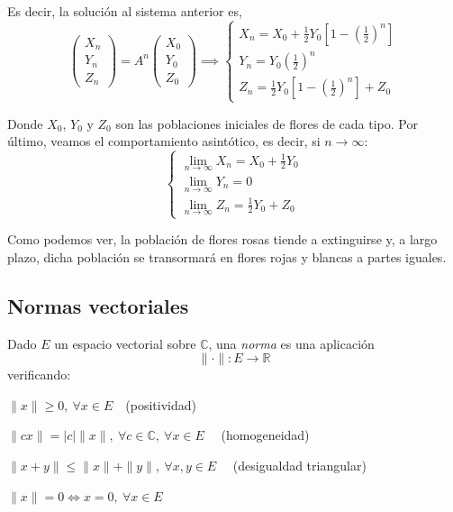 Es decir, la solución al sistema anterior es,
$$ \begin{pmatrix}
	X_n\\
	Y_n\\
	Z_n
\end{pmatrix} = A^n
\begin{pmatrix}
	X_0\\
	Y_0\\
	Z_0
\end{pmatrix} \implies
\begin{cases}
  X_n = X_0 + \frac{1}{2} Y_0 \left[ 1 - \left( \frac{1}{2} \right)^n
  \right]\\
  Y_n = Y_0 \left( \frac{1}{2} \right)^n \\
  Z_n = \frac{1}{2} Y_0 \left[ 1 - \left( \frac{1}{2} \right)^n
  \right]
  + Z_0
\end{cases}$$

Donde $X_0$, $Y_0$ y $Z_0$ son las poblaciones iniciales de flores de cada tipo. Por último, veamos el comportamiento asintótico, es decir, si $n\to\infty$:
$$\begin{cases}
\underset{n\to\infty }{\lim} X_n = X_0 + \frac{1}{2}Y_0\\
\underset{n\to\infty }{\lim}Y_n = 0\\
\underset{n\to\infty }{\lim}Z_n = \frac{1}{2}Y_0 + Z_0
\end{cases}$$

Como podemos ver, la población de flores rosas tiende a extinguirse y, a largo plazo, dicha población se transormará en flores rojas y blancas a partes iguales.

\subsection{Normas vectoriales}

\begin{ndef}
Dado $E$ un espacio vectorial sobre $\mathbb C$, una \textit{norma} es una aplicación $$\|\cdot\|: E \longrightarrow \mathbb{R}$$
verificando:
\begin{nlist}
	\item $\|x\| \ge 0, \ \forall x \in E\quad$(positividad)
	\item $\|cx\| = |c|\|x\|, \ \forall c \in \mathbb{C},\ \forall x \in E\quad$ (homogeneidad)
	\item $\|x + y \| \le \|x\| + \|y\|, \ \forall x,y \in E\quad$ (desigualdad triangular)
	\item $\|x\| = 0 \iff x = 0,\ \forall x \in E$

\end{nlist}
\end{ndef}


